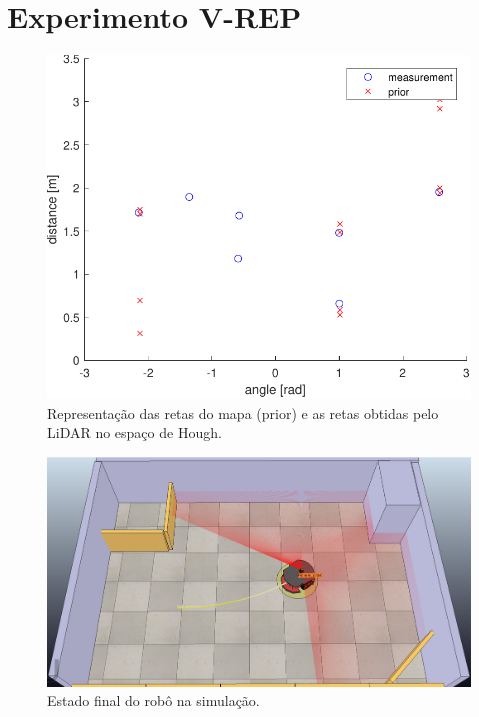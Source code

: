 \section{Experimento V-REP}

\begin{figure}[H]
	\centering
	\includegraphics[width=0.75\linewidth]{img/measuement}
	\caption{Representação das retas do mapa (prior) e as retas obtidas pelo LiDAR no espaço de Hough.}
	\label{fig:measuement}
\end{figure}

\begin{figure}[H]
	\centering
	\includegraphics[width=1\linewidth]{img/vrep}
	\caption{Estado final do robô na simulação.}
	\label{fig:vrep}
\end{figure}

